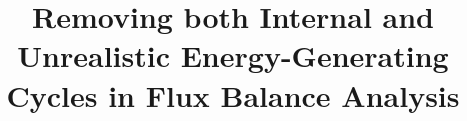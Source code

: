 \documentclass[twocolumn]{bmcart}%
\begin{document}
\begin{frontmatter}

\begin{fmbox}


\title{Removing both Internal and Unrealistic Energy-Generating Cycles in Flux Balance Analysis}


\author[
   addressref={aff1},                   %
   corref={aff1},                       %
   email={noor@imsb.biol.ethz.ch}       %
]{ }


\address[id=aff1]{%
  , %
  ,                             %
}




\end{fmbox}
\end{frontmatter}
\end{document}
